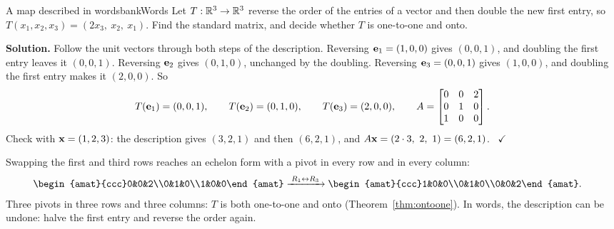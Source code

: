 \documentclass[11pt]{article}
\begin{document}
\begin{exmp}{A map described in words}{bankWords}
Let $T:\mathbb{R}^3\to\mathbb{R}^3$ reverse the order of the entries of a vector and then double the new first entry, so $T(x_1,x_2,x_3)=(2x_3,\ x_2,\ x_1)$. Find the standard matrix, and decide whether $T$ is one-to-one and onto.

\textbf{Solution.} Follow the unit vectors through both steps of the description. Reversing $\mathbf{e}_1=(1,0,0)$ gives $(0,0,1)$, and doubling the first entry leaves it $(0,0,1)$. Reversing $\mathbf{e}_2$ gives $(0,1,0)$, unchanged by the doubling. Reversing $\mathbf{e}_3=(0,0,1)$ gives $(1,0,0)$, and doubling the first entry makes it $(2,0,0)$. So
\[
T(\mathbf{e}_1)=(0,0,1),\qquad T(\mathbf{e}_2)=(0,1,0),\qquad T(\mathbf{e}_3)=(2,0,0),\qquad A=\begin{bmatrix}0&0&2\\0&1&0\\1&0&0\end{bmatrix}.
\]
Check with $\mathbf{x}=(1,2,3)$: the description gives $(3,2,1)$ and then $(6,2,1)$, and $A\bv{x}=(2\cdot3,\ 2,\ 1)=(6,2,1)$. \ $\checkmark$

Swapping the first and third rows reaches an echelon form with a pivot in every row and in every column:
\begin{align*}
\begin{amat}{ccc}0&0&2\\0&1&0\\1&0&0\end{amat}
&\rops{R_1\leftrightarrow R_3}
\begin{amat}{ccc}1&0&0\\0&1&0\\0&0&2\end{amat}.
\end{align*}
Three pivots in three rows and three columns: $T$ is both one-to-one and onto (Theorem~\ref{thm:ontoone}). In words, the description can be undone: halve the first entry and reverse the order again.
\end{exmp}
\end{document}
